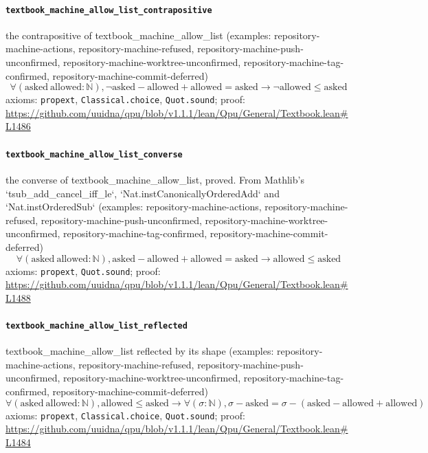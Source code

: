 \documentclass[11pt]{article}
\begin{document}
\paragraph{\texttt{textbook\_machine\_allow\_list\_contrapositive}}
the contrapositive of textbook\_machine\_allow\_list (examples: repository-machine-actions, repository-machine-refused, repository-machine-push-unconfirmed, repository-machine-worktree-unconfirmed, repository-machine-tag-confirmed, repository-machine-commit-deferred)
\[ \forall (\mathrm{asked}\ \mathrm{allowed} : \mathbb{N}), \neg \mathrm{asked} - \mathrm{allowed} + \mathrm{allowed} = \mathrm{asked} \to \neg \mathrm{allowed} \le \mathrm{asked} \]
\noindent axioms: \texttt{propext}, \texttt{Classical.choice}, \texttt{Quot.sound}; proof: \url{https://github.com/uuidna/qpu/blob/v1.1.1/lean/Qpu/General/Textbook.lean\#L1486}

\paragraph{\texttt{textbook\_machine\_allow\_list\_converse}}
the converse of textbook\_machine\_allow\_list, proved. From Mathlib's `tsub\_add\_cancel\_iff\_le`, `Nat.instCanonicallyOrderedAdd` and `Nat.instOrderedSub` (examples: repository-machine-actions, repository-machine-refused, repository-machine-push-unconfirmed, repository-machine-worktree-unconfirmed, repository-machine-tag-confirmed, repository-machine-commit-deferred)
\[ \forall (\mathrm{asked}\ \mathrm{allowed} : \mathbb{N}), \mathrm{asked} - \mathrm{allowed} + \mathrm{allowed} = \mathrm{asked} \to \mathrm{allowed} \le \mathrm{asked} \]
\noindent axioms: \texttt{propext}, \texttt{Quot.sound}; proof: \url{https://github.com/uuidna/qpu/blob/v1.1.1/lean/Qpu/General/Textbook.lean\#L1488}

\paragraph{\texttt{textbook\_machine\_allow\_list\_reflected}}
textbook\_machine\_allow\_list reflected by its shape (examples: repository-machine-actions, repository-machine-refused, repository-machine-push-unconfirmed, repository-machine-worktree-unconfirmed, repository-machine-tag-confirmed, repository-machine-commit-deferred)
\[ \forall (\mathrm{asked}\ \mathrm{allowed} : \mathbb{N}), \mathrm{allowed} \le \mathrm{asked} \to \forall (\sigma : \mathbb{N}), \sigma - \mathrm{asked} = \sigma - (\mathrm{asked} - \mathrm{allowed} + \mathrm{allowed}) \]
\noindent axioms: \texttt{propext}, \texttt{Classical.choice}, \texttt{Quot.sound}; proof: \url{https://github.com/uuidna/qpu/blob/v1.1.1/lean/Qpu/General/Textbook.lean\#L1484}
\end{document}

